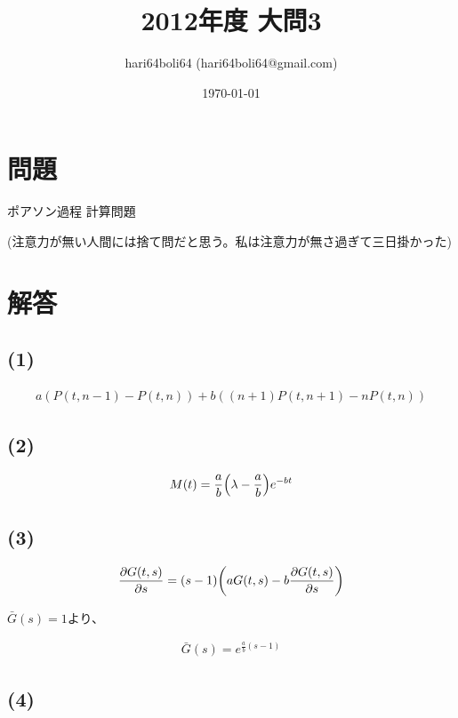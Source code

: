 \documentclass[a4paper, 10pt, dvipdfmx]{jlreq}
\begin{document}
\title{2012年度 大問3}
\author{hari64boli64 (hari64boli64@gmail.com)}
\date{\today}
\maketitle

\section{問題}

ポアソン過程 計算問題

(注意力が無い人間には捨て問だと思う。私は注意力が無さ過ぎて三日掛かった)

\section{解答}

\subsection*{(1)}

\begin{align*}
  a(P(t,n-1)-P(t,n))+b((n+1)P(t,n+1)-nP(t,n))
\end{align*}

\subsection*{(2)}

\begin{align*}
  M(t)=\frac{a}{b}\qty(\lambda-\frac{a}{b})e^{-bt}
\end{align*}

\subsection*{(3)}

\begin{align*}
  \pdv{G(t,s)}{s}=(s-1)\qty(aG(t,s)-b\pdv{G(t,s)}{s})
\end{align*}

$\bar{G}(s)=1$より、

\begin{align*}
  \bar{G}(s)=e^{\frac{a}{b}(s-1)}
\end{align*}

\subsection*{(4)}
\end{document}
